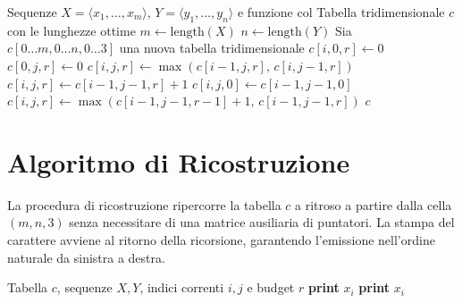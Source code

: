 \begin{algorithm}[H]
\caption{Calcolo della tabella delle lunghezze (\textsc{LCS-3R-Length})}
\label{alg:lcs3r-length}
\begin{algorithmic}[1]
\Require Sequenze $X = \langle x_1, \dots, x_m \rangle$, $Y = \langle y_1, \dots, y_n \rangle$ e funzione $\text{col}$
\Ensure Tabella tridimensionale $c$ con le lunghezze ottime
\State $m \gets \text{length}(X)$
\State $n \gets \text{length}(Y)$
\State Sia $c[0 \dots m, 0 \dots n, 0 \dots 3]$ una nuova tabella tridimensionale
 
        \State $c[i, 0, r] \gets 0$
    \EndFor
\EndFor
{} 
        \State $c[0, j, r] \gets 0$
    \EndFor
\EndFor
{}
                \State $c[i, j, r] \gets \max(c[i-1, j, r], \, c[i, j-1, r])$
                \State $c[i, j, r] \gets c[i-1, j-1, r] + 1$
                \State $c[i, j, 0] \gets c[i-1, j-1, 0]$
            \Else
                \State $c[i, j, r] \gets \max(c[i-1, j-1, r-1] + 1, \, c[i-1, j-1, r])$
            \EndIf
        \EndFor
    \EndFor
\EndFor
\State \Return $c$
\end{algorithmic}
\end{algorithm}

\newpage
\section{Algoritmo di Ricostruzione}

La procedura di ricostruzione ripercorre la tabella $c$ a ritroso a partire dalla cella $(m, n, 3)$ senza necessitare di una matrice ausiliaria di puntatori. La stampa del carattere avviene al ritorno della ricorsione, garantendo l'emissione nell'ordine naturale da sinistra a destra.

\begin{algorithm}[H]
\caption{Ricostruzione ricorsiva della soluzione ottima (\textsc{Print-LCS-3R})}
\label{alg:print-lcs3r}
\begin{algorithmic}[1]
\Require Tabella $c$, sequenze $X, Y$, indici correnti $i, j$ e budget $r$
    \State \Return
\EndIf
{}
        \State {}
    \Else
        \State {}
    \EndIf
{}
    \State {}
    \State \textbf{print} $x_i$
    \State {}
\Else
        \State {}
        \State \textbf{print} $x_i$
    \Else
        \State {}
    \EndIf
\EndIf
\end{algorithmic}
\end{algorithm}

